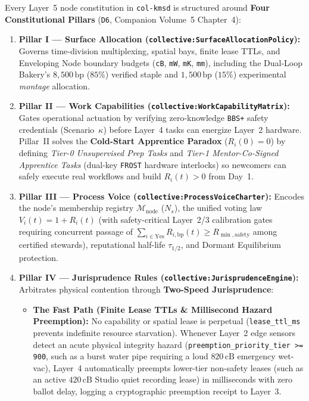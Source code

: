 Every Layer~5 node constitution in \texttt{col-kmsd} is structured around \textbf{Four Constitutional Pillars} (\texttt{D6}, Companion Volume~5 Chapter~4):
\begin{enumerate}
  \item \textbf{Pillar I --- Surface Allocation (\texttt{collective:SurfaceAllocationPolicy}):} Governs time-division multiplexing, spatial bays, finite lease TTLs, and Enveloping Node boundary budgets (\texttt{cB}, \texttt{mW}, \texttt{mK}, \texttt{mm}), including the Dual-Loop Bakery's $8{,}500\,\mathrm{bp}$ ($85\%$) verified staple and $1{,}500\,\mathrm{bp}$ ($15\%$) experimental \textit{montage} allocation.
  \item \textbf{Pillar II --- Work Capabilities (\texttt{collective:WorkCapabilityMatrix}):} Gates operational actuation by verifying zero-knowledge \texttt{BBS+} safety credentials (Scenario~$\kappa$) before Layer~4 tasks can energize Layer~2 hardware. Pillar~II solves the \textbf{Cold-Start Apprentice Paradox} ($R_i(0) = 0$) by defining \textit{Tier-0 Unsupervised Prep Tasks} and \textit{Tier-1 Mentor-Co-Signed Apprentice Tasks} (dual-key \texttt{FROST} hardware interlocks) so newcomers can safely execute real workflows and build $R_i(t) > 0$ from Day~1.
  \item \textbf{Pillar III --- Process Voice (\texttt{collective:ProcessVoiceCharter}):} Encodes the node's membership registry $\mathcal{M}_{\mathrm{node}}$ ($N_s$), the unified voting law $V_i(t) = 1 + R_i(t)$ (with safety-critical Layer~2/3 calibration gates requiring concurrent passage of $\sum_{i \in \text{Yes}} R_{i,\mathrm{bp}}(t) \ge R_{\min,\mathrm{safety}}$ among certified stewards), reputational half-life $\tau_{1/2}$, and Dormant Equilibrium protection.
  \item \textbf{Pillar IV --- Jurisprudence Rules (\texttt{collective:JurisprudenceEngine}):} Arbitrates physical contention through \textbf{Two-Speed Jurisprudence}:
  \begin{itemize}
    \item \textbf{The Fast Path (Finite Lease TTLs \& Millisecond Hazard Preemption):} No capability or spatial lease is perpetual (\texttt{lease\_ttl\_ms} prevents indefinite resource starvation). Whenever Layer~2 edge sensors detect an acute physical integrity hazard (\texttt{preemption\_priority\_tier >= 900}, such as a burst water pipe requiring a loud $820\,\mathrm{cB}$ emergency wet-vac), Layer~4 automatically preempts lower-tier non-safety leases (such as an active $420\,\mathrm{cB}$ Studio quiet recording lease) in milliseconds with zero ballot delay, logging a cryptographic preemption receipt to Layer~3.

\end{itemize}
\end{enumerate}

